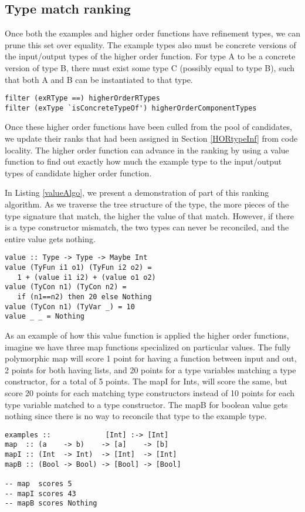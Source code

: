 \subsection{Type match ranking}\label{typeMatch}

Once both the examples and higher order functions have refinement types, we can prune this set over equality.
The example types also must be concrete versions of the input/output types of the higher order function.
For type A to be a concrete version of type B, there must exist some type C (possibly equal to type B), such that both A and B can be instantiated to that type.

\begin{lstlisting}[caption=Pruning based on types]
filter (exRType ==) higherOrderRTypes
filter (exType `isConcreteTypeOf') higherOrderComponentTypes
\end{lstlisting}

Once these higher order functions have been culled from the pool of candidates, we update their ranks that had been assigned in Section \ref{HORtypeInf} from code locality.
The higher order function can advance in the ranking by using a value function to find out exactly how much the example type  to the input/output types of candidate higher order function.

In Listing \ref{valueAlgo}, we present a demonstration of part of this ranking algorithm.
As we traverse the tree structure of the type, the more pieces of the type signature that match, the higher the value of that match. 
However, if there is a type constructor mismatch, the two types can never be reconciled, and the entire value gets nothing.

\begin{lstlisting}[caption=Type closeness ranking algorithm (sample),label=valueAlgo]
value :: Type -> Type -> Maybe Int
value (TyFun i1 o1) (TyFun i2 o2) =
   1 + (value i1 i2) + (value o1 o2)
value (TyCon n1) (TyCon n2) =
   if (n1==n2) then 20 else Nothing
value (TyCon n1) (TyVar _) = 10
value _ _ = Nothing
\end{lstlisting}

As an example of how this value function is applied the higher order functions, imagine we have three map functions specialized on particular values. 
The fully polymorphic map will score 1 point for having a function between input and out, 2 points for both having lists, and 20 points for a type variables matching a type constructor, for a total of 5 points. The mapI for Ints, will score the same, but score 20 points for each matching type constructors instead of 10 points for each type variable matched to a type constructor. The mapB for boolean value gets nothing since there is no way to reconcile that type to the example type.

\begin{lstlisting}
examples ::             [Int] :-> [Int]
map  :: (a    -> b)    -> [a]    -> [b]
mapI :: (Int  -> Int)  -> [Int]  -> [Int]
mapB :: (Bool -> Bool) -> [Bool] -> [Bool]

-- map  scores 5
-- mapI scores 43
-- mapB scores Nothing
\end{lstlisting}
